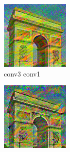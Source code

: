 \documentclass[twocolumn,superscriptaddress,aps, floatfix]{revtex4-1}
\begin{document}
\begin{figure}[ht]
\begin{subfigure}[b]{0.1\textwidth}
            \includegraphics[width=\textwidth]{resources/png/layers/conv3_conv1.png}
            \caption{conv3 conv1}
        \end{subfigure}
        \hfill
        \begin{subfigure}[b]{0.1\textwidth}
            \centering
            \includegraphics[width=\textwidth]{resources/png/layers/conv5_conv1.png}

\end{subfigure}
\end{figure}
\end{document}
